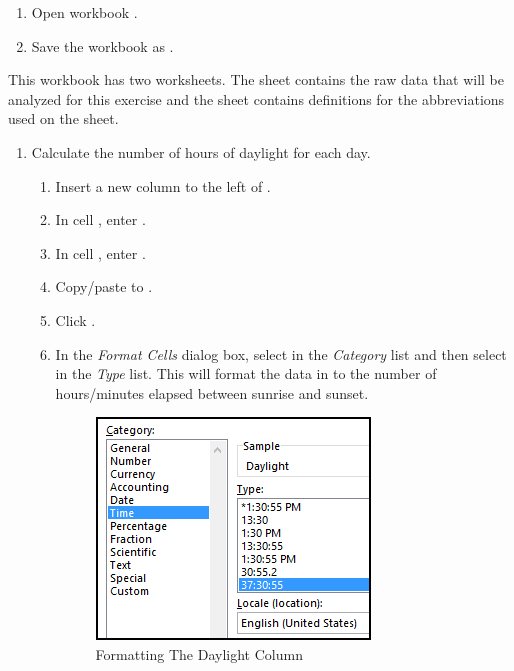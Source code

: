 \begin{enumerate}
	\item Open workbook .
	\item Save the workbook as .
\end{enumerate}

This workbook has two worksheets. The  sheet contains the raw data that will be analyzed for this exercise and the  sheet contains definitions for the abbreviations used on the  sheet.

\begin{enumerate}[resume]
	\item Calculate the number of hours of daylight for each day.
	
	\begin{enumerate}
		\item Insert a new column to the left of .
		\item In cell , enter .
		\item In cell , enter .
		\item Copy/paste  to .
		\item Click . 
		\item In the \textit{Format Cells} dialog box, select  in the \textit{Category} list and then select  in the \textit{Type} list. This will format the data in  to the number of hours/minutes elapsed between sunrise and sunset.
		
		\begin{figure}[H]
			\centering
			\includegraphics[width=\maxwidth{.75\linewidth}]{gfx/ch09_fig80}
			\caption{Formatting The Daylight Column}
			\label{09:fig80}
		\end{figure}
		

\end{enumerate}
\end{enumerate}
